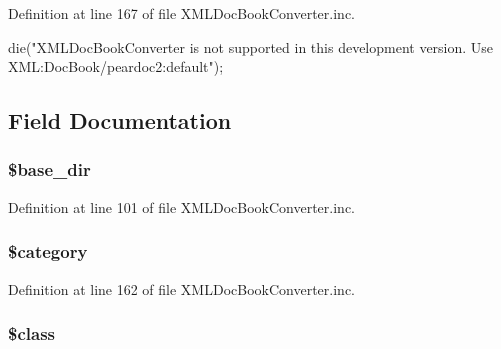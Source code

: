 \-Definition at line 167 of file \-X\-M\-L\-Doc\-Book\-Converter.\-inc.


\begin{DoxyCode}
    {
        die("XMLDocBookConverter is not supported in this development version. 
       Use XML:DocBook/peardoc2:default");
    }
\end{DoxyCode}


\subsection{\-Field \-Documentation}
\hypertarget{class_x_m_l_doc_book_converter_aa36f57c62963507498e1181f9a75bbb9}{
\subsubsection[{\$base\-\_\-dir}]{\setlength{\rightskip}{0pt plus 5cm}\$base\-\_\-dir}}\label{class_x_m_l_doc_book_converter_aa36f57c62963507498e1181f9a75bbb9}


\-Definition at line 101 of file \-X\-M\-L\-Doc\-Book\-Converter.\-inc.

\hypertarget{class_x_m_l_doc_book_converter_a18b2a8d133fa7733bf34abcc6ca2ef5b}{
\subsubsection[{\$category}]{\setlength{\rightskip}{0pt plus 5cm}\$category}}\label{class_x_m_l_doc_book_converter_a18b2a8d133fa7733bf34abcc6ca2ef5b}


\-Definition at line 162 of file \-X\-M\-L\-Doc\-Book\-Converter.\-inc.

\hypertarget{class_x_m_l_doc_book_converter_a252ba022809910ea710a068fc1bab657}{
\subsubsection[{\$class}]{\setlength{\rightskip}{0pt plus 5cm}\$class}}\label{class_x_m_l_doc_book_converter_a252ba022809910ea710a068fc1bab657}


